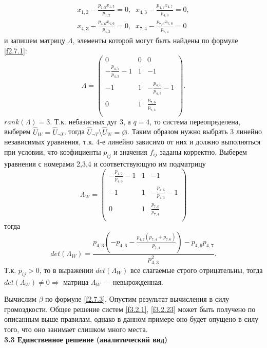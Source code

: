 \documentclass[14pt]{extarticle}%
\begin{document}
\begin{equation}\label{f3.2.23}
\begin{gathered}
x_{1,2}-\frac{p_{1,5} x_{1,5}}{p_{1,2}}=0,\;\;
x_{4,3}-\frac{p_{4,7} x_{4,7}}{p_{4,3}}=0,\\
x_{4,3}-\frac{p_{4,6} x_{4,6}}{p_{4,3}}=0,\;\;
x_{7,4}-\frac{p_{7,6} x_{7,6}}{p_{7,4}}=0
\end{gathered}
\end{equation}
и запишем матрицу $\Lambda$, элементы которой могут быть найдены по формуле \eqref{f2.7.1}:
$$
\Lambda=\left(
\begin{array}{ccc}
 0 & 0 & 0 \\
 -\frac{p_{4,7}}{p_{4,3}}-1 & 1 & -1 \\
 -1 & 1 & -\frac{p_{4,6}}{p_{4,3}}-1 \\
 0 & 1 & \frac{p_{7,6}}{p_{7,4}} \\
\end{array}
\right).
$$
$rank(\Lambda)=3$. Т.к. небазисных дуг 3, а $q=4$, то система переопределена, выберем $\widehat{U}_W=\widehat{U}_{\neg T}$, тогда $\widehat{U}_{\neg T}\setminus\widehat{U}_W=\varnothing$. Таким образом нужно выбрать 3 линейно независимых уравнения, т.к. 4-е линейно зависимо от них и должно выполняться при условии, что коэфициенты $p_{ij}$ и значения $f_{ij}$ заданы корректно. Выберем уравнения с номерами 2,3,4 и соответствующую им подматрицу
$$\Lambda_W=
\left(
\begin{array}{ccc}
 -\frac{p_{4,7}}{p_{4,3}}-1 & 1 & -1 \\
 -1 & 1 & -\frac{p_{4,6}}{p_{4,3}}-1 \\
 0 & 1 & \frac{p_{7,6}}{p_{7,4}} \\
\end{array}
\right)$$
тогда 
$$det(\Lambda_W)=\frac{p_{4,3} \left(-p_{4,6}-\frac{p_{4,7} \left(p_{7,4}+p_{7,6}\right)}{p_{7,4}}\right)-p_{4,6} p_{4,7}}{p_{4,3}^2}.$$
Т.к. $p_{ij}>0$, то в выражении $det(\Lambda_W)$ все слагаемые строго отрицательны, тогда $det(\Lambda_W)\neq 0 \Rightarrow$ матрица $\Lambda_W$ --- невырожденная. 

Вычислим $\beta$ по формуле \eqref{f2.7.3}. Опустим результат вычисления в силу громоздкости.
Общее решение систем \eqref{f3.2.1}, \eqref{f3.2.23} может быть получено по описанным выше правилам, однако в данном примере оно будет опущено в силу того, что оно занимает слишком много места.\\

\textbf{3.3 Единственное решение (аналитический вид)}
\end{document}
